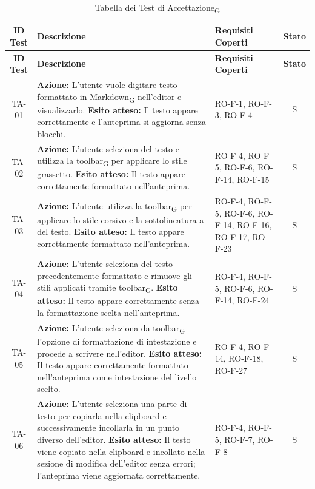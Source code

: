 \documentclass[11pt,a4paper]{article}
\newcommand{\gls}[1]{#1\textsubscript{G}}
\begin{document}
\begin{longtable}{|c|p{9cm}|p{3cm}|c|}
\hline
\textbf{ID Test} & \textbf{Descrizione} & \textbf{Requisiti Coperti} & \textbf{Stato} \\
\hline
\endfirsthead

\hline
\textbf{ID Test} & \textbf{Descrizione} & \textbf{Requisiti Coperti} & \textbf{Stato} \\
\hline
\endhead

\caption{Tabella dei \gls{Test di Accettazione}} \label{tab:test_accettazione} 
\endlastfoot

TA-01 & \textbf{Azione:} L'utente vuole digitare testo formattato in \gls{Markdown} nell'editor e visualizzarlo. \newline \textbf{Esito atteso:} Il testo appare correttamente e l'anteprima si aggiorna senza blocchi. & RO-F-1, RO-F-3, RO-F-4 & S \\
\hline
TA-02 & \textbf{Azione:} L'utente seleziona del testo e utilizza la \gls{toolbar} per applicare lo stile grassetto. \newline \textbf{Esito atteso:} Il testo appare correttamente formattato nell'anteprima. & RO-F-4, RO-F-5, RO-F-6, RO-F-14, RO-F-15 & S \\
\hline
TA-03 & \textbf{Azione:} L'utente utilizza la \gls{toolbar} per applicare lo stile corsivo e la sottolineatura a del testo. \newline \textbf{Esito atteso:} Il testo appare correttamente formattato nell'anteprima. & RO-F-4, RO-F-5, RO-F-6, RO-F-14, RO-F-16, RO-F-17, RO-F-23  & S \\
\hline
TA-04 & \textbf{Azione:} L'utente seleziona del testo precedentemente formattato e rimuove gli stili applicati tramite \gls{toolbar}. \newline \textbf{Esito atteso:} Il testo appare correttamente senza la formattazione scelta nell'anteprima. & RO-F-4, RO-F-5, RO-F-6, RO-F-14, RO-F-24  & S \\
\hline
TA-05 & \textbf{Azione:} L'utente seleziona da \gls{toolbar} l'opzione di formattazione di intestazione e procede a scrivere nell'editor. \newline \textbf{Esito atteso:} Il testo appare correttamente formattato nell'anteprima come intestazione del livello scelto. & RO-F-4, RO-F-14, RO-F-18, RO-F-27  & S \\
\hline
TA-06 & \textbf{Azione:} L'utente seleziona una parte di testo per copiarla nella clipboard e successivamente incollarla in un punto diverso dell'editor. \newline \textbf{Esito atteso:} Il testo viene copiato nella clipboard e incollato nella sezione di modifica dell'editor senza errori; l'anteprima viene aggiornata correttamente. & RO-F-4, RO-F-5, RO-F-7, RO-F-8  & S \\

\end{longtable}
\end{document}
